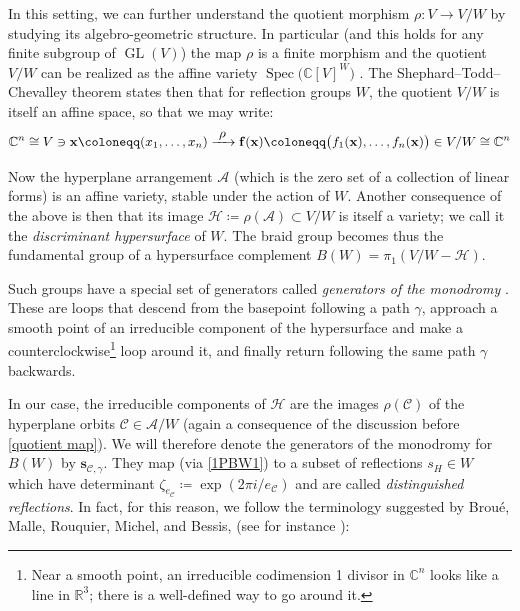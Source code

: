 \documentclass[ALCO, Unicode]{cedram}
\newcommand{\op}[1]{\operatorname{#1}}
\newcommand{\RR}{\mathbb{R}}
\newcommand{\CC}{\mathbb{C}}
\newcommand{\op}[1]{\operatorname{#1}}
\begin{document}
In this setting, we can further understand the quotient morphism $\rho:V\rightarrow V/W$ by studying its algebro-geometric structure. In particular (and this holds for any finite subgroup of $\op{GL}(V)$) the map $\rho$ is a finite morphism and the quotient $V/W$ can be realized as the affine variety $\op{Spec}\big(\CC[V]^W\big)$ \cite[Exer.~13.2-4 and Sec.~1.7]{eisenbud-commutative-algebra}. The Shephard--Todd--Chevalley theorem states then that for reflection groups $W$, the quotient $V/W$ is itself an affine space, so that we may write: 
\begin{equation}\label{quotient map}
\CC^n\cong V\ni{\bf x}\coloneqq (x_1,\ldots,x_n)\xrightarrow{\ \displaystyle\rho\ } {\bf f}({\bf x})\coloneqq \big(f_1({\bf x}),\ldots,f_n({\bf x})\big)\in V/W\cong \CC^n
\end{equation}

Now the hyperplane arrangement $\mathcal{A}$ (which is the zero set of a collection of linear forms) is an affine variety, stable under the action of $W$. Another consequence of the above is then that its image $\mathcal{H}\coloneqq \rho(\mathcal{A})\subset V/W$ is itself a variety; we call it the {\it discriminant hypersurface} of $W$. The braid group becomes thus the fundamental group of a hypersurface complement $B(W)=\pi_1(V/W-\mathcal{H})$.

Such groups have a special set of generators called {\it generators of the monodromy} \cite[Appendix~1]{broue-malle-rouquier-braid-hecke}. These are loops that descend from the basepoint following a path $\gamma$, approach a smooth point of an irreducible component of the hypersurface and make a counterclockwise\footnote{Near a smooth point, an irreducible codimension 1 divisor in $\CC^n$ looks like a line in $\RR^3$; there is a well-defined way to go around it.} loop around it, and finally return following the same path $\gamma$ backwards. 

In our case, the irreducible components of $\mathcal{H}$ are the images $\rho(\mathcal{C})$ of the hyperplane orbits $\mathcal{C}\in\mathcal{A}/W$ (again a consequence of the discussion before \eqref{quotient map}). We will therefore denote the generators of the monodromy for $B(W)$ by $\bm s_{\mathcal{C},\gamma}$. They map (via \eqref{1PBW1}) to a subset of reflections $s_H\in W$ which have determinant $\zeta_{e_{\mathcal{C}}}\coloneqq \op{exp}(2\pi i/e_{\mathcal{C}})$ and are called {\it distinguished reflections}. In fact, for this reason, we follow the terminology suggested by Brou{\'e}, Malle, Rouquier, Michel, and Bessis, (see for instance \cite[Defn.~1.6]{bes-kpi1}):
\end{document}
